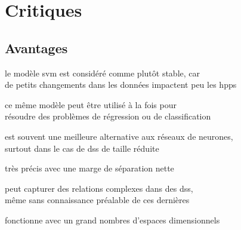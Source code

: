 \section{Critiques}


\subsection{Avantages}


\begin{itmz}

\item{le modèle \gls{svm} est considéré comme plutôt stable, car\\
de petits changements dans les données impactent peu les \glspl{hpp}}

\end{itmz}\begin{itmz}

\item{ce même modèle peut être utilisé à la fois pour\\
résoudre des problèmes de régression ou de classification}

\end{itmz}\begin{itmz}

\item{est souvent une meilleure alternative aux réseaux de neurones,\\
surtout dans le cas de \glspl{ds} de taille réduite}

\end{itmz}\begin{itmz}

\item{très précis avec une marge de séparation nette}

\end{itmz}\begin{itmz}

\item{peut capturer des relations complexes dans des \glspl{ds},\\
même sans connaissance préalable de ces dernières}

\end{itmz}\begin{itmz}

\item{fonctionne avec un grand nombres d’espaces dimensionnels}

\end{itmz}\begin{itmz}


\end{itmz}
